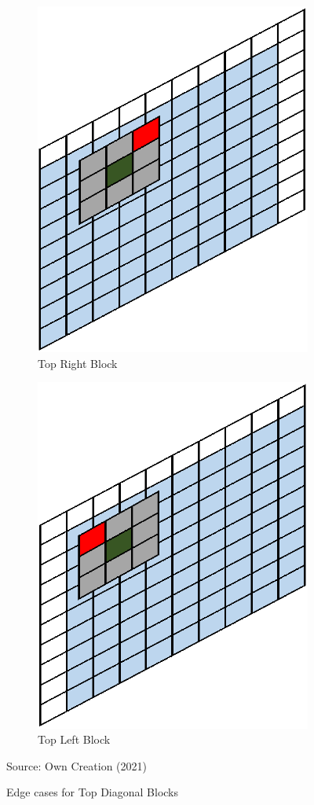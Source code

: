 \begin{figure}[H]
\centering
\begin{subfigure}{.5\textwidth}
  \centering
  \includegraphics[width=.5\linewidth]{Figures/Chapter3/topright}
  \caption{Top Right Block}
\end{subfigure}%
\begin{subfigure}{.5\textwidth}
  \centering
  \includegraphics[width=.5\linewidth]{Figures/Chapter3/topleft}
  \caption{Top Left Block}
\end{subfigure}
\caption{Edge cases for Top Diagonal Blocks}
\begin{center}
Source: Own Creation (2021)
\end{center}
\end{figure}

